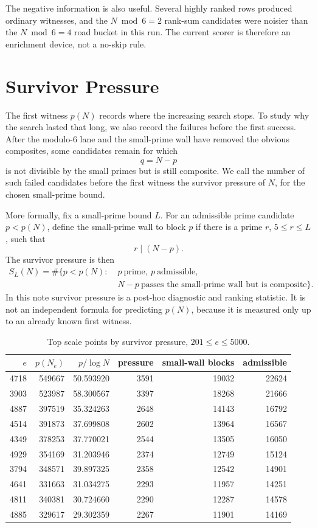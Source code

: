 \documentclass[11pt]{article}
\begin{document}
The negative information is also useful. Several highly ranked rows produced
ordinary witnesses, and the \(N\bmod6=2\) rank-sum candidates were noisier
than the \(N\bmod6=4\) road bucket in this run. The current scorer is
therefore an enrichment device, not a no-skip rule.

\section{Survivor Pressure}

The first witness \(p(N)\) records where the increasing search stops. To study
why the search lasted that long, we also record the failures before the first
success. After the modulo-\(6\) lane and the small-prime wall have removed the
obvious composites, some candidates remain for which
\[
  q=N-p
\]
is not divisible by the small primes but is still composite. We call the
number of such failed candidates before the first witness the survivor
pressure of \(N\), for the chosen small-prime bound.

More formally, fix a small-prime bound \(L\). For an admissible prime
candidate \(p<p(N)\), define the small-prime wall to block \(p\) if there is a
prime \(r\), \(5\le r\le L\), such that
\[
  r\mid(N-p).
\]
The survivor pressure is then
\[
  \begin{aligned}
  S_L(N)=\#\{p<p(N):\;&p\ \text{prime},\ p\ \text{admissible},\\
  &N-p\ \text{passes the small-prime wall but is composite}\}.
  \end{aligned}
\]
In this note survivor pressure is a post-hoc diagnostic and ranking statistic.
It is not an independent formula for predicting \(p(N)\), because it is
measured only up to an already known first witness.

\begin{table}[!htbp]
\centering
\caption{Top scale points by survivor pressure, \(201\le e\le5000\).}
\label{tab:pressure}
\begin{tabular}{rrrrrr}
\toprule
\(e\) & \(p(N_e)\) & \(p/\log N\) & pressure & small-wall blocks & admissible \\
\midrule
4718 & 549667 & 50.593920 & 3591 & 19032 & 22624 \\
3903 & 523987 & 58.300567 & 3397 & 18268 & 21666 \\
4887 & 397519 & 35.324263 & 2648 & 14143 & 16792 \\
4514 & 391873 & 37.699808 & 2602 & 13964 & 16567 \\
4349 & 378253 & 37.770021 & 2544 & 13505 & 16050 \\
4929 & 354169 & 31.203946 & 2374 & 12749 & 15124 \\
3794 & 348571 & 39.897325 & 2358 & 12542 & 14901 \\
4641 & 331663 & 31.034275 & 2293 & 11957 & 14251 \\
4811 & 340381 & 30.724660 & 2290 & 12287 & 14578 \\
4885 & 329617 & 29.302359 & 2267 & 11901 & 14169 \\
\bottomrule
\end{tabular}
\end{table}
\end{document}
